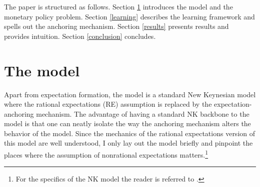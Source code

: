\documentclass[11pt]{article}
\renewcommand{\[}{\begin{equation}}
\renewcommand{\]}{\end{equation}}
\begin{document}
The paper is structured as follows. Section \ref{NK} introduces the model and the monetary policy problem. Section \ref{learning} describes the learning framework and spells out the anchoring mechanism. Section \ref{results} presents results and provides intuition. Section \ref{conclusion} concludes.

\section{The model}\label{NK}
Apart from expectation formation, the model is a standard New Keynesian model where the rational expectations (RE) assumption is replaced by the expectation-anchoring mechanism. The advantage of having a standard NK backbone to the model is that one can neatly isolate the way the anchoring mechanism alters the behavior of the model. Since the mechanics of the rational expectations version of this model are well understood, I only lay out the model briefly and pinpoint the places where the assumption of nonrational expectations matters.\footnote{For the specifics of the NK model the reader is referred to \cite{woodford2011interest}.}
\end{document}
